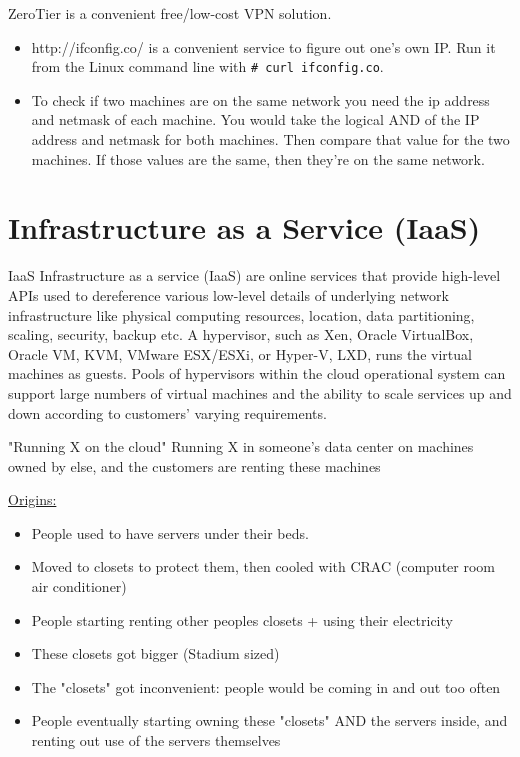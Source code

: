 \documentclass[fancy,11pt,titlestyle=display]{style/elegantbook}
\begin{document}
\begin{note}
ZeroTier is a convenient free/low-cost VPN solution.
    \begin{itemize}
        \item http://ifconfig.co/ is a convenient service to figure out one's own IP.  Run it from the Linux command line with \lstinline{# curl ifconfig.co}.
        \item To check if two machines are on the same network you need the ip address and netmask of each machine. You would take the logical AND of the IP address and netmask for both machines. Then compare that value for the two machines. If those values are the same, then they're on the same network.
    \end{itemize}
\end{note}




\section{Infrastructure as a Service (IaaS)}
\begin{definition}{IaaS}{}
Infrastructure as a service (IaaS) are online services that provide high-level APIs used to dereference various low-level details of underlying network infrastructure like physical computing resources, location, data partitioning, scaling, security, backup etc. A hypervisor, such as Xen, Oracle VirtualBox, Oracle VM, KVM, VMware ESX/ESXi, or Hyper-V, LXD, runs the virtual machines as guests. Pools of hypervisors within the cloud operational system can support large numbers of virtual machines and the ability to scale services up and down according to customers' varying requirements.\end{definition}
\begin{definition}{"Running X on the cloud"}{}
Running X in someone's data center on machines owned by else, and the customers are renting these machines
\end{definition}

\underline{Origins:}
\begin{itemize}
    \item People used to have servers under their beds.
    \item Moved to closets to protect them, then cooled with CRAC (computer room air conditioner)
    \item People starting renting other peoples closets + using their electricity
    \item These closets got bigger (Stadium sized)
    \item The "closets" got inconvenient: people would be coming in and out too often
    \item People eventually starting owning these "closets" AND the servers inside, and renting out use of the servers themselves
\end{itemize}
\end{document}
